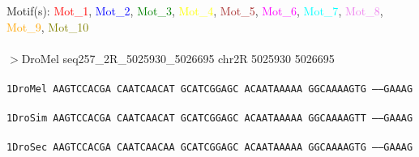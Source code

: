 \documentclass[11pt,twoside,reqno,a4paper]{article}
\begin{document}
\noindent
\newlength{\charwidth}Motif(s): \textcolor{red}{Mot\_1}, \textcolor{blue}{Mot\_2}, \textcolor{green}{Mot\_3}, \textcolor{yellow}{Mot\_4}, \textcolor{brown}{Mot\_5}, \textcolor{magenta}{Mot\_6}, \textcolor{cyan}{Mot\_7}, \textcolor{violet}{Mot\_8}, \textcolor{orange}{Mot\_9}, \textcolor{olive}{Mot\_10}\\
\\
$>$DroMel	seq257\_2R\_5025930\_5026695	chr2R	5025930	5026695 \\
 \\
\texttt{1\hspace*{4\charwidth}DroMel	AAGTCCACGA	CAATCAACAT	GCATCGGAGC	ACAATAAAAA	GGCAAAAGTG	-----GAAAG	\\
\hspace*{5\charwidth}\hspace*{7\charwidth}\hspace*{1\charwidth}\hspace*{1\charwidth}\hspace*{1\charwidth}\hspace*{1\charwidth}\hspace*{1\charwidth}\hspace*{1\charwidth}\\
1\hspace*{4\charwidth}DroSim	AAGTCCACGA	CAATCAACAT	GCATCGGAGC	ACAATAAAAA	GGCAAAAGTT	-----GAAAG	\\
\hspace*{5\charwidth}\hspace*{7\charwidth}\hspace*{1\charwidth}\hspace*{1\charwidth}\hspace*{1\charwidth}\hspace*{1\charwidth}\hspace*{1\charwidth}\hspace*{1\charwidth}\\
1\hspace*{4\charwidth}DroSec	AAGTCCACGA	CAATCAACAA	GCATCGGAGC	ACAATAAAAA	GGCAAAAGTG	-----GAAAG	\\
\hspace*{5\charwidth}\hspace*{7\charwidth}\hspace*{1\charwidth}\hspace*{1\charwidth}\hspace*{1\charwidth}\hspace*{1\charwidth}\hspace*{1\charwidth}\hspace*{1\charwidth}\\
}
\end{document}
